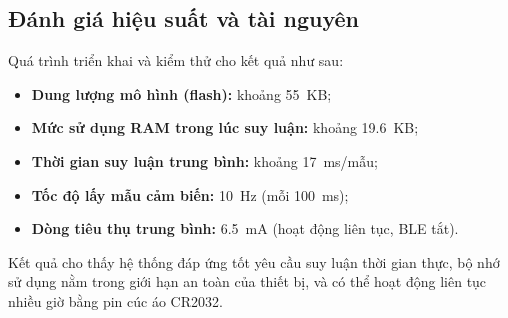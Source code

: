 \subsection{Đánh giá hiệu suất và tài nguyên}




Quá trình triển khai và kiểm thử cho kết quả như sau:

\begin{itemize}
    \item \textbf{Dung lượng mô hình (flash):} khoảng 55~KB;
    \item \textbf{Mức sử dụng RAM trong lúc suy luận:} khoảng 19.6~KB;
    \item \textbf{Thời gian suy luận trung bình:} khoảng 17~ms/mẫu;
    \item \textbf{Tốc độ lấy mẫu cảm biến:} 10~Hz (mỗi 100~ms);
    \item \textbf{Dòng tiêu thụ trung bình:} 6.5~mA (hoạt động liên tục, BLE tắt).
\end{itemize}

Kết quả cho thấy hệ thống đáp ứng tốt yêu cầu suy luận thời gian thực, bộ nhớ sử dụng nằm trong giới hạn an toàn của thiết bị, và có thể hoạt động liên tục nhiều giờ bằng pin cúc áo CR2032.



